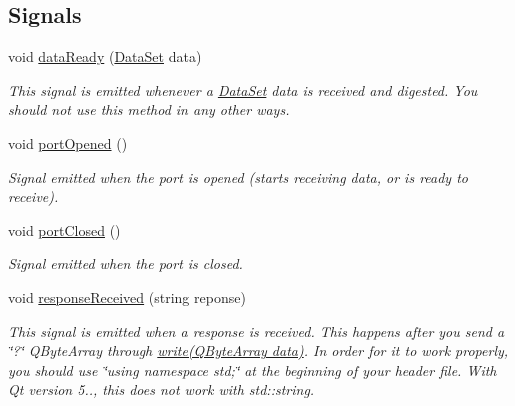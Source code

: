 \subsection*{Signals}
\begin{DoxyCompactItemize}
\item 
void \hyperlink{classAcquisitionServer_afe942f82316df744efea514192eab408}{data\+Ready} (\hyperlink{classDataSet}{Data\+Set} data)
\begin{DoxyCompactList}\small\item\em This signal is emitted whenever a \hyperlink{classDataSet}{Data\+Set} data is received and digested. You should not use this method in any other ways. \end{DoxyCompactList}\item 
\hypertarget{classAcquisitionServer_aed4b01d28af98b861b01dc78be3f3a22}{void \hyperlink{classAcquisitionServer_aed4b01d28af98b861b01dc78be3f3a22}{port\+Opened} ()}\label{classAcquisitionServer_aed4b01d28af98b861b01dc78be3f3a22}

\begin{DoxyCompactList}\small\item\em Signal emitted when the port is opened (starts receiving data, or is ready to receive). \end{DoxyCompactList}\item 
\hypertarget{classAcquisitionServer_ad3778a6c70cb04d68c9bfbdb0d0b4a1d}{void \hyperlink{classAcquisitionServer_ad3778a6c70cb04d68c9bfbdb0d0b4a1d}{port\+Closed} ()}\label{classAcquisitionServer_ad3778a6c70cb04d68c9bfbdb0d0b4a1d}

\begin{DoxyCompactList}\small\item\em Signal emitted when the port is closed. \end{DoxyCompactList}\item 
void \hyperlink{classAcquisitionServer_a3c338c806917b259b5ba50d2da353569}{response\+Received} (string reponse)
\begin{DoxyCompactList}\small\item\em This signal is emitted when a response is received. This happens after you send a \char`\"{}?\char`\"{} Q\+Byte\+Array through \hyperlink{classAcquisitionServer_af5fd99ccd1a3bef0dd0ef8eff2935423}{write(\+Q\+Byte\+Array data)}. In order for it to work properly, you should use \char`\"{}using namespace std;\char`\"{} at the beginning of your header file. With Qt version 5.., this does not work with std\+::string. \end{DoxyCompactList}\end{DoxyCompactItemize}
